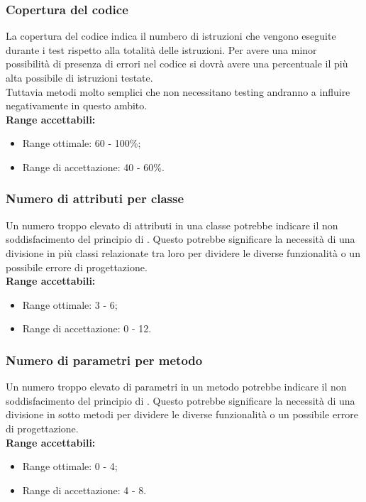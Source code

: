 \documentclass{scalatekids-article}
\begin{document}
\subsubsection{Copertura del codice}
La copertura del codice indica il numbero di istruzioni che vengono eseguite durante i test rispetto alla totalità delle istruzioni. Per avere una minor possibilità di presenza di errori nel codice si dovrà avere una percentuale il più alta possibile di istruzioni testate.\\Tuttavia metodi molto semplici che non necessitano testing andranno a influire negativamente in questo ambito.\\
\textbf{Range accettabili:}
\begin{itemize}
  \item Range ottimale: 60 - 100\%;
  \item Range di accettazione: 40 - 60\%.
\end{itemize}
\subsubsection{Numero di attributi per classe}
Un numero troppo elevato di attributi in una classe potrebbe indicare il non soddisfacimento del principio di \textit{}. Questo potrebbe significare la necessità di una divisione in più classi relazionate tra loro per dividere le diverse funzionalità o un possibile errore di progettazione.\\
\textbf{Range accettabili:}
\begin{itemize}
  \item Range ottimale: 3 - 6;
  \item Range di accettazione: 0 - 12.
\end{itemize}
\subsubsection{Numero di parametri per metodo}
Un numero troppo elevato di parametri in un metodo potrebbe indicare il non soddisfacimento del principio di \textit{}. Questo potrebbe significare la necessità di una divisione in sotto metodi per dividere le diverse funzionalità o un possibile errore di progettazione.\\
\textbf{Range accettabili:}
\begin{itemize}
  \item Range ottimale: 0 - 4;
  \item Range di accettazione: 4 - 8.
\end{itemize}
\end{document}
